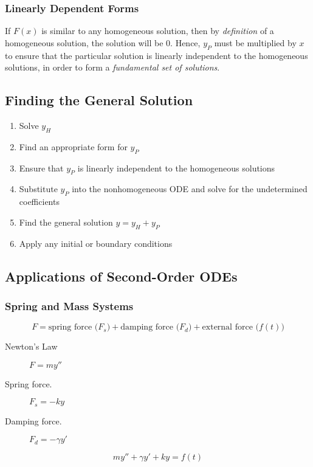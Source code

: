 \documentclass{article}
\begin{document}
\subsubsection{Linearly Dependent Forms}
If \(F\left( x \right)\) is similar to any homogeneous solution, then by
\textit{definition} of a homogeneous solution, the solution will be
\(0\). Hence, \(y_P\) must be multiplied by \(x\) to ensure that the
particular solution is linearly independent to the homogeneous
solutions, in order to form a \textit{fundamental set of solutions}.
\subsection{Finding the General Solution}
\begin{enumerate}
    \item Solve \(y_H\)
    \item Find an appropriate form for \(y_P\)
    \item Ensure that \(y_P\) is linearly independent to the
          homogeneous solutions
    \item Substitute \(y_P\) into the nonhomogeneous ODE and solve for
          the undetermined coefficients
    \item Find the general solution \(y = y_H + y_P\)
    \item Apply any initial or boundary conditions
\end{enumerate}
\subsection{Applications of Second-Order ODEs}
\subsubsection{Spring and Mass Systems}
\begin{equation*}
    F = \text{spring force (\(F_s\))} + \text{damping force (\(F_d\))} + \text{external force (\(f\left( t \right)\))}
\end{equation*}
\begin{description}
    \item[Newton's Law] \(F = m y''\)
    \item[Spring force.] \(F_s = -k y\)
    \item[Damping force.] \(F_d = -\gamma y'\)
\end{description}
\begin{equation*}
    m y'' + \gamma y' + k y = f\left( t \right)
\end{equation*}
\end{document}

